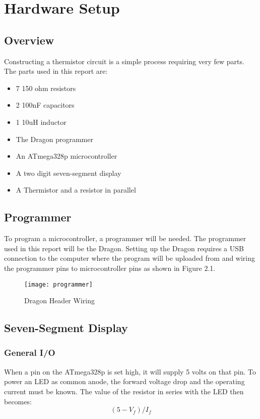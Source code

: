 \documentclass[main.tex]{subfiles}
\begin{document}
\chapter{Hardware Setup}
	\section{Overview}
	Constructing a thermistor circuit is a simple process requiring very few parts. The parts
	used in this report are:
	\begin{itemize}
		\item 7 150 ohm resistors
		\item 2 100nF capacitors
		\item 1 10uH inductor
		\item The Dragon programmer
		\item An ATmega328p microcontroller
		\item A two digit seven-segment display
		\item A Thermistor and a resistor in parallel
	\end{itemize}
	
	
	\section{Programmer}
	To program a microcontroller, a programmer will be needed. The programmer used in this report
	will be the Dragon. Setting up the Dragon requires a USB connection to the computer where
	the program will be uploaded from and wiring the programmer pins to microcontroller pins
	as shown in Figure 2.1.
	\begin{figure}[H]
		\begin{center}
			\texttt{[image: programmer]}
		\end{center}
		\caption{Dragon Header Wiring}
		\label{fig:prog}
	\end{figure}	


	\section{Seven-Segment Display}
		\subsection{General I/O}
		When a pin on the ATmega328p is set high, it will supply 5 volts on that pin. To power an
		LED as common anode, the forward voltage drop and the operating current must be known.
		The value of the resistor in series with the LED then becomes: \[(5 - V_f)/I_f\]
		
\end{document}

